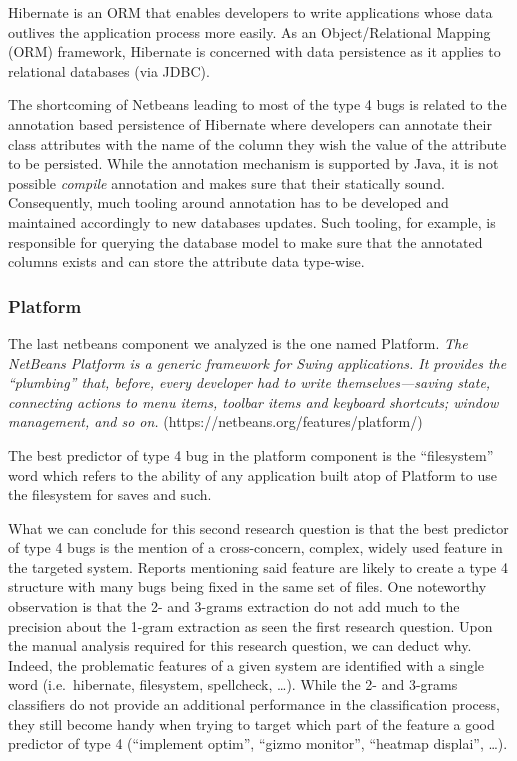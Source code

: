 \documentclass[12pt]{report}
\begin{document}
Hibernate is an ORM that enables developers to write applications whose
data outlives the application process more easily. As an
Object/Relational Mapping (ORM) framework, Hibernate is concerned with
data persistence as it applies to relational databases (via JDBC).

The shortcoming of Netbeans leading to most of the type 4 bugs is
related to the annotation based persistence of Hibernate where
developers can annotate their class attributes with the name of the
column they wish the value of the attribute to be persisted. While the
annotation mechanism is supported by Java, it is not possible
\emph{compile} annotation and makes sure that their statically sound.
Consequently, much tooling around annotation has to be developed and
maintained accordingly to new databases updates. Such tooling, for
example, is responsible for querying the database model to make sure
that the annotated columns exists and can store the attribute data
type-wise.

\subsubsection{Platform}\label{platform}

The last netbeans component we analyzed is the one named Platform.
\emph{The NetBeans Platform is a generic framework for Swing
applications. It provides the ``plumbing'' that, before, every developer
had to write themselves---saving state, connecting actions to menu
items, toolbar items and keyboard shortcuts; window management, and so
on.} (https://netbeans.org/features/platform/)

The best predictor of type 4 bug in the platform component is the
``filesystem'' word which refers to the ability of any application built
atop of Platform to use the filesystem for saves and such.

What we can conclude for this second research question is that the best
predictor of type 4 bugs is the mention of a cross-concern, complex,
widely used feature in the targeted system. Reports mentioning said
feature are likely to create a type 4 structure with many bugs being
fixed in the same set of files. One noteworthy observation is that the
2- and 3-grams extraction do not add much to the precision about the
1-gram extraction as seen the first research question. Upon the manual
analysis required for this research question, we can deduct why. Indeed,
the problematic features of a given system are identified with a single
word (i.e.~hibernate, filesystem, spellcheck, \ldots{}). While the 2-
and 3-grams classifiers do not provide an additional performance in the
classification process, they still become handy when trying to target
which part of the feature a good predictor of type 4 (``implement
optim'', ``gizmo monitor'', ``heatmap displai'', \ldots{}).
\end{document}
